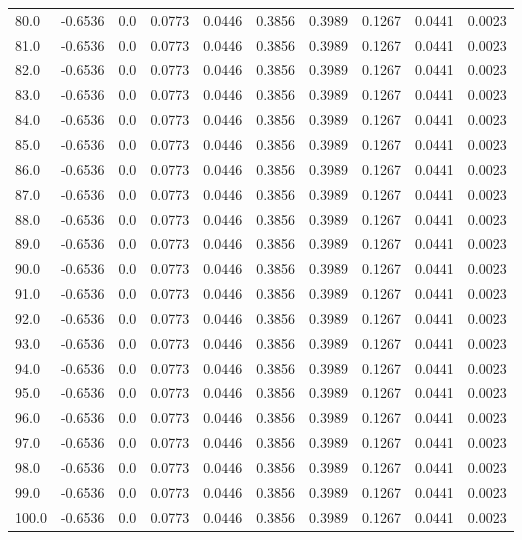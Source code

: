 \begin{longtable}{lrrrrrrrrr}
80.0 & -0.6536 & 0.0 & 0.0773 & 0.0446 & 0.3856 & 0.3989 & 0.1267 & 0.0441 & 0.0023 \\
81.0 & -0.6536 & 0.0 & 0.0773 & 0.0446 & 0.3856 & 0.3989 & 0.1267 & 0.0441 & 0.0023 \\
82.0 & -0.6536 & 0.0 & 0.0773 & 0.0446 & 0.3856 & 0.3989 & 0.1267 & 0.0441 & 0.0023 \\
83.0 & -0.6536 & 0.0 & 0.0773 & 0.0446 & 0.3856 & 0.3989 & 0.1267 & 0.0441 & 0.0023 \\
84.0 & -0.6536 & 0.0 & 0.0773 & 0.0446 & 0.3856 & 0.3989 & 0.1267 & 0.0441 & 0.0023 \\
85.0 & -0.6536 & 0.0 & 0.0773 & 0.0446 & 0.3856 & 0.3989 & 0.1267 & 0.0441 & 0.0023 \\
86.0 & -0.6536 & 0.0 & 0.0773 & 0.0446 & 0.3856 & 0.3989 & 0.1267 & 0.0441 & 0.0023 \\
87.0 & -0.6536 & 0.0 & 0.0773 & 0.0446 & 0.3856 & 0.3989 & 0.1267 & 0.0441 & 0.0023 \\
88.0 & -0.6536 & 0.0 & 0.0773 & 0.0446 & 0.3856 & 0.3989 & 0.1267 & 0.0441 & 0.0023 \\
89.0 & -0.6536 & 0.0 & 0.0773 & 0.0446 & 0.3856 & 0.3989 & 0.1267 & 0.0441 & 0.0023 \\
90.0 & -0.6536 & 0.0 & 0.0773 & 0.0446 & 0.3856 & 0.3989 & 0.1267 & 0.0441 & 0.0023 \\
91.0 & -0.6536 & 0.0 & 0.0773 & 0.0446 & 0.3856 & 0.3989 & 0.1267 & 0.0441 & 0.0023 \\
92.0 & -0.6536 & 0.0 & 0.0773 & 0.0446 & 0.3856 & 0.3989 & 0.1267 & 0.0441 & 0.0023 \\
93.0 & -0.6536 & 0.0 & 0.0773 & 0.0446 & 0.3856 & 0.3989 & 0.1267 & 0.0441 & 0.0023 \\
94.0 & -0.6536 & 0.0 & 0.0773 & 0.0446 & 0.3856 & 0.3989 & 0.1267 & 0.0441 & 0.0023 \\
95.0 & -0.6536 & 0.0 & 0.0773 & 0.0446 & 0.3856 & 0.3989 & 0.1267 & 0.0441 & 0.0023 \\
96.0 & -0.6536 & 0.0 & 0.0773 & 0.0446 & 0.3856 & 0.3989 & 0.1267 & 0.0441 & 0.0023 \\
97.0 & -0.6536 & 0.0 & 0.0773 & 0.0446 & 0.3856 & 0.3989 & 0.1267 & 0.0441 & 0.0023 \\
98.0 & -0.6536 & 0.0 & 0.0773 & 0.0446 & 0.3856 & 0.3989 & 0.1267 & 0.0441 & 0.0023 \\
99.0 & -0.6536 & 0.0 & 0.0773 & 0.0446 & 0.3856 & 0.3989 & 0.1267 & 0.0441 & 0.0023 \\
100.0 & -0.6536 & 0.0 & 0.0773 & 0.0446 & 0.3856 & 0.3989 & 0.1267 & 0.0441 & 0.0023 \\

\end{longtable}
